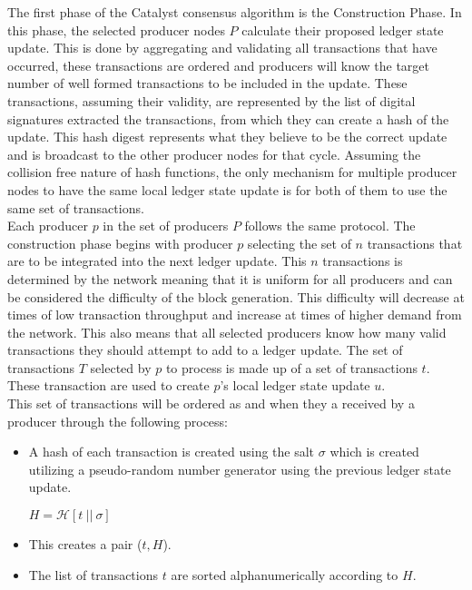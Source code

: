 The first phase of the Catalyst consensus algorithm is the Construction Phase. In this phase, the selected producer nodes $P$ calculate their proposed ledger state update. This is done by aggregating and validating all transactions that have occurred, these transactions are ordered and producers will know the target number of well formed transactions to be included in the update. These transactions, assuming their validity, are represented by the list of digital signatures extracted the transactions, from which they can create a hash of the update. This hash digest represents what they believe to be the correct update and is broadcast to the other producer nodes for that cycle. Assuming the collision free nature of hash functions, the only mechanism for multiple producer nodes to have the same local ledger state update is for both of them to use the same set of transactions. \\

Each producer $p$ in the set of producers $P$ follows the same protocol. The construction phase begins with producer $p$ selecting the set of $n$ transactions that are to be integrated into the next ledger update. This $n$ transactions is determined by the network meaning that it is uniform for all producers and can be considered the difficulty of the block generation. This difficulty will decrease at times of low transaction throughput and increase at times of higher demand from the network. This also means that all selected producers know how many valid transactions they should attempt to add to a ledger update. The set of transactions $T$ selected by $p$ to process is made up of a set of transactions $t$. These transaction are used to create $p$'s local ledger state update $u$. \\

This set of transactions will be ordered as and when they a received by a producer through the following process:

\begin{itemize} 
\item A hash of each transaction is created using the salt $\sigma$ which is created utilizing a pseudo-random number generator using the previous ledger state update.
\begin{center}
$H = \mathcal{H}[t~||~\sigma]$
\end{center}
\item This creates a pair ($t,H$).
\item The list of transactions $t$ are sorted alphanumerically according to $H$.
\end{itemize}


